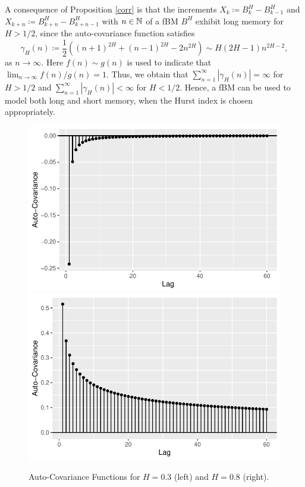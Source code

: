 A consequence of Proposition \ref{corr} is that the increments $X_{k}\coloneqq B_{k}^{H}-B_{k-1}^{H}$ and $X_{k+n}\coloneqq B_{k+n}^{H}-B_{k+n-1}^{H}$ with $n\in\mathbb{N}$ of a fBM $B^{H}$ exhibit long memory for $H>1/2$, since the auto-covariance function satisfies
\begin{equation}\label{asymp}
\gamma_{H}(n)\coloneqq \frac{1}{2}\left((n+1)^{2H}+(n-1)^{2H}-2n^{2H}\right) \sim H(2H-1)n^{2H-2},
\end{equation}
as $n\to\infty$. Here $f(n)\sim g(n)$ is used to indicate that $\lim_{n\to\infty}f(n)/g(n)=1$. Thus, we obtain that $\sum_{n=1}^{\infty}|\gamma_{H}(n)|=\infty$ for $H>1/2$ and $\sum_{n=1}^{\infty}|\gamma_{H}(n)|<\infty$ for $H<1/2$. Hence, a fBM can be used to model both long and short memory, when the Hurst index is chosen appropriately. 
\begin{figure}[H]
    \centering
    \includegraphics[scale = 0.55]{fig/img/acf/acf2.pdf}
    \includegraphics[scale=0.55]{fig/img/acf/acf1.pdf}
    \caption{Auto-Covariance Functions for $H=0.3$ (left) and $H=0.8$ (right).}
    \label{fig:enter-label}
\end{figure}
